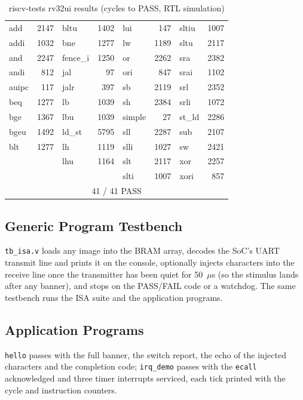 \documentclass[journal,10pt]{IEEEtran}
\newcommand{\reg}[1]{\texttt{#1}}
\begin{document}
\begin{table}[t]
\caption{riscv-tests rv32ui results (cycles to PASS, RTL simulation)}
\label{tab:isa}
\centering
\scriptsize
\setlength{\tabcolsep}{3pt}
\begin{tabular}{@{}lr|lr|lr|lr@{}}
\toprule
add & 2147 & bltu & 1402 & lui & 147 & sltiu & 1007 \\
addi & 1032 & bne & 1277 & lw & 1189 & sltu & 2117 \\
and & 2247 & fence\_i & 1250 & or & 2262 & sra & 2382 \\
andi & 812 & jal & 97 & ori & 847 & srai & 1102 \\
auipc & 117 & jalr & 397 & sb & 2119 & srl & 2352 \\
beq & 1277 & lb & 1039 & sh & 2384 & srli & 1072 \\
bge & 1367 & lbu & 1039 & simple & 27 & st\_ld & 2286 \\
bgeu & 1492 & ld\_st & 5795 & sll & 2287 & sub & 2107 \\
blt & 1277 & lh & 1119 & slli & 1027 & sw & 2421 \\
 & & lhu & 1164 & slt & 2117 & xor & 2257 \\
 & & & & slti & 1007 & xori & 857 \\
\midrule
\multicolumn{8}{c}{41 / 41 PASS} \\
\bottomrule
\end{tabular}
\end{table}

\subsection{Generic Program Testbench}
\reg{tb\_isa.v} loads any image into the BRAM array, decodes the SoC's UART
transmit line and prints it on the console, optionally injects characters
into the receive line once the transmitter has been quiet for 50~$\mu$s (so
the stimulus lands after any banner), and stops on the PASS/FAIL code or a
watchdog. The same testbench runs the ISA suite and the application
programs.

\subsection{Application Programs}
\reg{hello} passes with the full banner, the switch report, the echo of the
injected characters and the completion code; \reg{irq\_demo} passes with the
\reg{ecall} acknowledged and three timer interrupts serviced, each tick
printed with the cycle and instruction counters.
\end{document}
